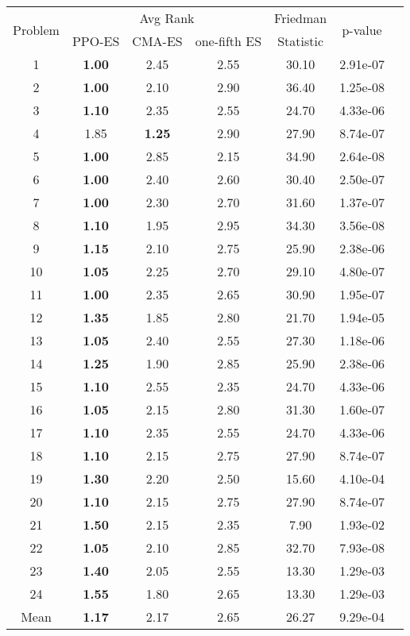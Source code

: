
        \begin{tabular}{ccccccc}
        \toprule
        \multirow{2}{*}{Problem} & \multicolumn{3}{c}{Avg Rank} & Friedman & \multirow{2}{*}{p-value} \\
        \cline{2-4}
        & PPO-ES & CMA-ES & one-fifth ES & Statistic & \\
        \midrule
        1 & \textbf{1.00} & 2.45 & 2.55 & 30.10 & 2.91e-07 \\
2 & \textbf{1.00} & 2.10 & 2.90 & 36.40 & 1.25e-08 \\
3 & \textbf{1.10} & 2.35 & 2.55 & 24.70 & 4.33e-06 \\
4 & 1.85 & \textbf{1.25} & 2.90 & 27.90 & 8.74e-07 \\
5 & \textbf{1.00} & 2.85 & 2.15 & 34.90 & 2.64e-08 \\
6 & \textbf{1.00} & 2.40 & 2.60 & 30.40 & 2.50e-07 \\
7 & \textbf{1.00} & 2.30 & 2.70 & 31.60 & 1.37e-07 \\
8 & \textbf{1.10} & 1.95 & 2.95 & 34.30 & 3.56e-08 \\
9 & \textbf{1.15} & 2.10 & 2.75 & 25.90 & 2.38e-06 \\
10 & \textbf{1.05} & 2.25 & 2.70 & 29.10 & 4.80e-07 \\
11 & \textbf{1.00} & 2.35 & 2.65 & 30.90 & 1.95e-07 \\
12 & \textbf{1.35} & 1.85 & 2.80 & 21.70 & 1.94e-05 \\
13 & \textbf{1.05} & 2.40 & 2.55 & 27.30 & 1.18e-06 \\
14 & \textbf{1.25} & 1.90 & 2.85 & 25.90 & 2.38e-06 \\
15 & \textbf{1.10} & 2.55 & 2.35 & 24.70 & 4.33e-06 \\
16 & \textbf{1.05} & 2.15 & 2.80 & 31.30 & 1.60e-07 \\
17 & \textbf{1.10} & 2.35 & 2.55 & 24.70 & 4.33e-06 \\
18 & \textbf{1.10} & 2.15 & 2.75 & 27.90 & 8.74e-07 \\
19 & \textbf{1.30} & 2.20 & 2.50 & 15.60 & 4.10e-04 \\
20 & \textbf{1.10} & 2.15 & 2.75 & 27.90 & 8.74e-07 \\
21 & \textbf{1.50} & 2.15 & 2.35 & 7.90 & 1.93e-02 \\
22 & \textbf{1.05} & 2.10 & 2.85 & 32.70 & 7.93e-08 \\
23 & \textbf{1.40} & 2.05 & 2.55 & 13.30 & 1.29e-03 \\
24 & \textbf{1.55} & 1.80 & 2.65 & 13.30 & 1.29e-03 \\
\midrule
Mean & \textbf{1.17} & 2.17 & 2.65 & 26.27 & 9.29e-04 \\
\bottomrule
\end{tabular}